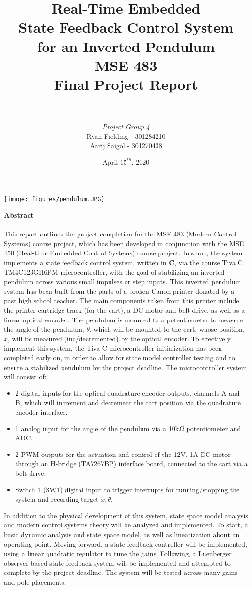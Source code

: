 \documentclass[12pt]{article}
\title{\textbf{Real-Time Embedded\\State Feedback Control System\\ for an Inverted Pendulum\\} \bigskip MSE 483\\Final Project Report}
\author{\\ \\\textit{Project Group 4}\\Ryan Fielding - 301284210\\Aarij Saigol - 301270438}
\date{April $15^{th}$, 2020}
\begin{document}
\maketitle
\begin{center}
    \texttt{[image: figures/pendulum.JPG]}
\end{center}

\newpage

{\Large \textbf{Abstract\\\\}}
This report outlines the project completion for the MSE 483 (Modern Control Systems) course project, which has been developed in conjunction with the MSE 450 (Real-time Embedded Control Systems) course project. In short, the system implements a state feedback control system, written in \textbf{C}, via the course Tiva C TM4C123GH6PM microcontroller, with the goal of stabilizing an inverted pendulum across various small impulses or step inputs. This inverted pendulum system has been built from the parts of a broken Canon printer donated by a past high school teacher. The main components taken from this printer include the printer cartridge track (for the cart), a DC motor and belt drive, as well as a linear optical encoder. The pendulum is mounted to a potentiometer to measure the angle of the pendulum, $\theta$, which will be mounted to the cart, whose position, $x$, will be measured (inc/decremented) by the optical encoder. To effectively implement this system, the Tiva C microcontroller initialization has been completed early on, in order to allow for state model controller testing and to ensure a stabilized pendulum by the project deadline. The microcontroller system will consist of:
\begin{itemize}
\item 2 digital inputs for the optical quadrature encoder outputs, channels A and B, which will increment and decrement the cart position via the quadrature encoder interface.
\item 1 analog input for the angle of the pendulum via a 10k$\Omega$ potentiometer and ADC.
\item 2 PWM outputs for the actuation and control of the 12V, 1A DC motor through an H-bridge (TA7267BP) interface board, connected to the cart via a belt drive.
\item Switch 1 (SW1) digital input to trigger interrupts for running/stopping the system and recording target $x,\theta$.
\end{itemize}
In addition to the physical development of this system, state space model analysis and modern control systems theory will be analyzed and implemented. To start, a basic dynamic analysis and state space model, as well as linearization about an operating point. Moving forward, a state feedback controller will be implemented, using a linear quadratic regulator to tune the gains. Following, a Luenberger observer based state feedback system will be implemented and attempted to complete by the project deadline. The system will be tested across many gains and pole placements.\bigskip
\end{document}
